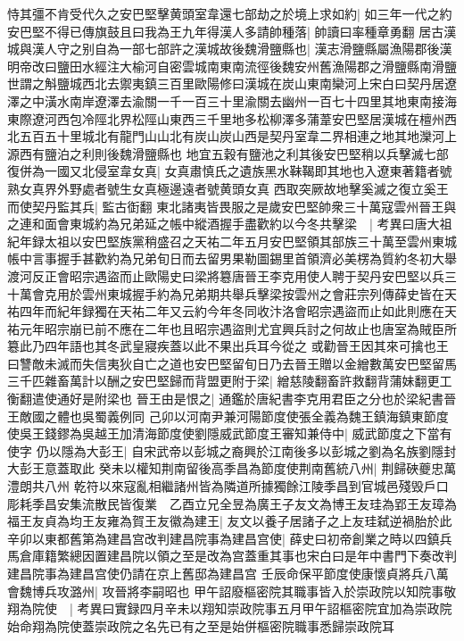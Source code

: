 恃其彊不肯受代久之安巴堅擊黄頭室韋還七部劫之於境上求如約|{
	如三年一代之約}
安巴堅不得已傳旗鼓且曰我為王九年得漢人多請帥種落|{
	帥讀曰率種章勇翻}
居古漢城與漢人守之别自為一部七部許之漢城故後魏滑鹽縣也|{
	漢志滑鹽縣屬漁陽郡後漢明帝改曰鹽田水經注大榆河自密雲城南東南流徑後魏安州舊漁陽郡之滑鹽縣南滑鹽世謂之斛鹽城西北去禦夷鎮三百里歐陽修曰漢城在炭山東南欒河上宋白曰契丹居遼澤之中潢水南岸遼澤去渝關一千一百三十里渝關去幽州一百七十四里其地東南接海東際遼河西包冷陘北界松陘山東西三千里地多松柳澤多蒲葦安巴堅居漢城在檀州西北五百五十里城北有龍門山山北有炭山炭山西是契丹室韋二界相連之地其地灤河上源西有鹽泊之利則後魏滑鹽縣也}
地宜五穀有鹽池之利其後安巴堅稍以兵擊滅七部復併為一國又北侵室韋女真|{
	女真肅慎氏之遺族黑水靺鞨即其地也入遼東著籍者號熟女真界外野處者號生女真極邊遠者號黄頭女真}
西取突厥故地擊奚滅之復立奚王而使契丹監其兵|{
	監古衘翻}
東北諸夷皆畏服之是歲安巴堅帥衆三十萬寇雲州晉王與之連和面會東城約為兄弟延之帳中縱酒握手盡歡約以今冬共擊梁　|{
	考異曰唐大祖紀年録太祖以安巴堅族黨稍盛召之天祐二年五月安巴堅領其部族三十萬至雲州東城帳中言事握手甚歡約為兄弟旬日而去留男果勒圖錫里首領濟必美楞為質約冬初大舉渡河反正會昭宗遇盜而止歐陽史曰梁將簒唐晉王李克用使人聘于契丹安巴堅以兵三十萬會克用於雲州東城握手約為兄弟期共舉兵擊梁按雲州之會莊宗列傳薛史皆在天祐四年而紀年録獨在天祐二年又云約今年冬同收汴洛會昭宗遇盜而止如此則應在天祐元年昭宗崩已前不應在二年也且昭宗遇盜則尤宜興兵討之何故止也唐室為賊臣所簒此乃四年語也其冬武皇寢疾蓋以此不果出兵耳今從之}
或勸晉王因其來可擒也王曰讐敵未滅而失信夷狄自亡之道也安巴堅留旬日乃去晉王贈以金繒數萬安巴堅留馬三千匹雜畜萬計以酬之安巴堅歸而背盟更附于梁|{
	繒慈陵翻畜許救翻背蒲妹翻更工衡翻遣使通好是附梁也}
晉王由是恨之|{
	通鑑於唐紀書李克用君臣之分也於梁紀書晉王敵國之體也吳蜀義例同}
己卯以河南尹兼河陽節度使張全義為魏王鎮海鎮東節度使吳王錢鏐為吳越王加清海節度使劉隱威武節度王審知兼侍中|{
	威武節度之下當有使字}
仍以隱為大彭王|{
	自宋武帝以彭城之裔興於江南後多以彭城之劉為名族劉隱封大彭王意蓋取此}
癸未以權知荆南留後高季昌為節度使荆南舊統八州|{
	荆歸硤夔忠萬澧朗共八州}
乾符以來寇亂相繼諸州皆為隣道所據獨餘江陵季昌到官城邑殘毁戶口彫耗季昌安集流散民皆復業　乙酉立兄全昱為廣王子友文為博王友珪為郢王友璋為福王友貞為均王友雍為賀王友徽為建王|{
	友文以養子居諸子之上友珪弑逆禍胎於此}
辛卯以東都舊第為建昌宫改判建昌院事為建昌宫使|{
	薛史曰初帝創業之時以四鎮兵馬倉庫籍繁總因置建昌院以領之至是改為宫蓋重其事也宋白曰是年中書門下奏改判建昌院事為建昌宫使仍請在京上舊邸為建昌宫}
壬辰命保平節度使康懷貞將兵八萬會魏博兵攻潞州|{
	攻晉將李嗣昭也}
甲午詔廢樞密院其職事皆入於崇政院以知院事敬翔為院使　|{
	考異曰實録四月辛未以翔知崇政院事五月甲午詔樞密院宜加為崇政院始命翔為院使蓋崇政院之名先已有之至是始併樞密院職事悉歸崇政院耳}
